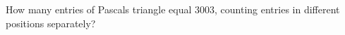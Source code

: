 How many entries of Pascal\textquotesingle s triangle equal $3003$, counting entries in different positions separately?
